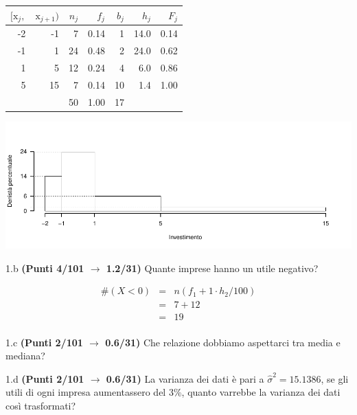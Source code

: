 \documentclass[
  11pt,
]{book}
\theoremstyle{mytheoremstyle}
\theoremstyle{mydefstyle}
\newenvironment{sol}
  {
  \begin{tcolorbox}[enhanced,breakable,arc=0.1mm,boxrule=1pt,colback=white,colframe=iblue,
  title=\bf \fontfamily{lmss}\selectfont \hspace{.5 cm} Soluzione,drop fuzzy shadow]

}{
\end{tcolorbox}
  }
\begin{document}
\begin{sol}

\begin{table}[H]
\centering
\begin{tabular}{rrrrrrr}
\toprule
$[\text{x}_j,$ & $\text{x}_{j+1})$ & $n_j$ & $f_j$ & $b_j$ & $h_j$ & $F_j$\\
\midrule
-2 & -1 & 7 & 0.14 & 1 & 14.0 & 0.14\\
-1 & 1 & 24 & 0.48 & 2 & 24.0 & 0.62\\
1 & 5 & 12 & 0.24 & 4 & 6.0 & 0.86\\
5 & 15 & 7 & 0.14 & 10 & 1.4 & 1.00\\
 &  & 50 & 1.00 & 17 &  & \\
\bottomrule
\end{tabular}
\end{table}

\begin{center}\includegraphics{Esami_passati_con_soluzioni_files/figure-latex/2023-157-1} \end{center}

\end{sol}

1.b \textbf{(Punti 4/101 \(\rightarrow\) 1.2/31)} Quante imprese hanno un utile negativo?

\begin{sol}
\begin{eqnarray*}
  \#(X<0) &=&  n (f_1 + 1\cdot h_2/100)\\
  &=& 7 + 12\\
  &=& 19\\
\end{eqnarray*}

\end{sol}

1.c \textbf{(Punti 2/101 \(\rightarrow\) 0.6/31)} Che relazione dobbiamo aspettarci tra media e mediana?

1.d \textbf{(Punti 2/101 \(\rightarrow\) 0.6/31)} La varianza dei dati è pari a \(\hat\sigma^2=15.1386\), se gli utili di ogni impresa aumentassero del 3\%, quanto varrebbe la varianza dei dati così trasformati?
\end{document}
